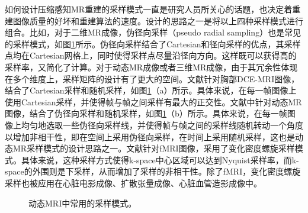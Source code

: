 如何设计压缩感知MR重建的采样模式一直是研究人员所关心的话题，也决定着重建图像质量的好坏和重建算法的速度。设计的思路之一是将以上四种采样模式进行组合。比如，对于二维MR成像，伪径向采样\cite{Sajan2011Accelerated}（pseudo radial sampling）也是常见的采样模式，如图\ref{fig:maskdynamic}所示。伪径向采样结合了Cartesian和径向采样的优点，其采样点均在Cartesian网格上，同时使得采样点尽量沿径向方向。这样既可以获得高的采样率，又简化了计算。对于动态MR成像或者三维MR成像，由于其冗余性体现在多个维度上，采样矩阵的设计有了更大的空间。文献\cite{smith2012}针对胸部DCE-MRI图像，结合了Cartesian采样和随机采样，如图\ref{fig:maskdynamic}（a）所示。具体来说，在每一帧图像上使用Cartesian采样，并使得帧与帧之间采样有最大的正交性。文献\cite{Sajan2011Accelerated}中针对动态MR图像，结合了伪径向采样和随机采样，如图\ref{fig:maskdynamic}（b）所示。具体来说，在每一帧图像上均匀地选取一些伪径向采样线，并使得帧与帧之间的采样线随机转动一个角度以增加非相干性，即在空间上采用伪径向采样，在时间上采用随机采样，这也是动态MR采样模式的设计思路之一。文献\cite{holland2013compressed}针对fMRI图像，采用了变化密度螺旋采样模式。具体来说，这种采样方式使得k-space中心区域可以达到Nyquist采样率，而k-space的外围则是下采样，从而增加了采样的非相干性。除了fMRI，变化密度螺旋采样也被应用在心脏电影成像\cite{kressler2007three}、扩散张量成像\cite{karampinos2009high}、心脏血管造影成像\cite{santos2006single}中。

\begin{figure}[htbp]
\centering
{}
\caption{动态MRI中常用的采样模式。}
\label{fig:maskdynamic}
\end{figure}


